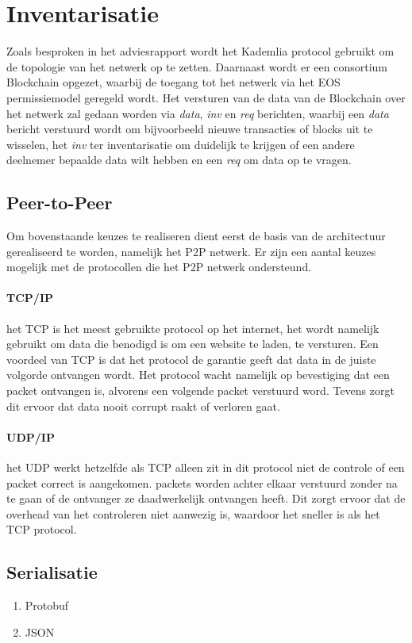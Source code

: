 \section{Inventarisatie}

Zoals besproken in het adviesrapport wordt het Kademlia protocol gebruikt om de topologie van het netwerk op te zetten. Daarnaast wordt er een consortium Blockchain opgezet, waarbij de toegang tot het netwerk via het EOS permissiemodel geregeld wordt. Het versturen van de data van de Blockchain over het netwerk zal gedaan worden via \textit{data}, \textit{inv} en \textit{req} berichten, waarbij een \textit{data} bericht verstuurd wordt om bijvoorbeeld nieuwe transacties of blocks uit te wisselen, het \textit{inv} ter inventarisatie om duidelijk te krijgen of een andere deelnemer bepaalde data wilt hebben en een \textit{req} om data op te vragen.

\subsection{Peer-to-Peer}
Om bovenstaande keuzes te realiseren dient eerst de basis van de architectuur gerealiseerd te worden, namelijk het \acrfull{P2P} netwerk. Er zijn een aantal keuzes mogelijk met de protocollen die het \acrshort{P2P} netwerk ondersteund.

\paragraph{TCP/IP} het \acrfull{TCP} is het meest gebruikte protocol op het internet, het wordt namelijk gebruikt om data die benodigd is om een website te laden, te versturen. Een voordeel van \acrshort{TCP} is dat het protocol de garantie geeft dat data in de juiste volgorde ontvangen wordt. Het protocol wacht namelijk op bevestiging dat een \gls{packet} ontvangen is, alvorens een volgende \gls{packet} verstuurd word. Tevens zorgt dit ervoor dat data nooit corrupt raakt of verloren gaat.

\paragraph{UDP/IP} het \acrfull{UDP} werkt hetzelfde als \acrshort{TCP} alleen zit in dit protocol niet de controle of een \gls{packet} correct is aangekomen. \Glspl{packet} worden achter elkaar verstuurd zonder na te gaan of de ontvanger ze daadwerkelijk ontvangen heeft. Dit zorgt ervoor dat de overhead van het controleren niet aanwezig is, waardoor het sneller is als het \acrshort{TCP} protocol.

\subsection{Serialisatie}

\begin{enumerate}
  \item Protobuf
  \item JSON
\end{enumerate}

